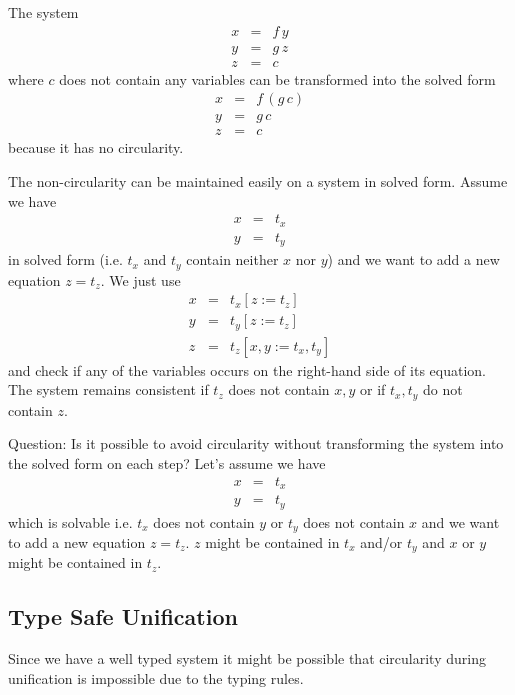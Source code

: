 The system
$$
\begin{array}{lll}
  x &=& f\, y
  \\
  y &=& g\, z
  \\
  z &=& c
\end{array}
$$
%
where $c$ does not contain any variables can be transformed into the solved
form
$$
\begin{array}{lll}
  x &=& f\, (g \, c)
  \\
  y &=& g\, c
  \\
  z &=& c
\end{array}
$$
%
because it has no circularity.

The non-circularity can be maintained easily on a system in solved
form. Assume we have
$$
%
\begin{array}{lll}
  x &=& t_x
  \\
  y &=& t_y
\end{array}
$$
%
in solved form (i.e. $t_x$ and $t_y$ contain neither $x$ nor $y$) and we want
to add a new equation $z = t_z$. We just use
$$
%
\begin{array}{lll}
  x &=& t_x[z := t_z]
  \\
  y &=& t_y[z := t_z]
  \\
  z &=& t_z[x,y := t_x, t_y]
\end{array}
$$
%
and check if any of the variables occurs on the right-hand side of its
equation. The system remains consistent if $t_z$ does not contain $x,y$ or if
$t_x,t_y$ do not contain $z$.


Question: Is it possible to avoid circularity without transforming the system
into the solved form on each step? Let's assume we have
$$
%
\begin{array}{lll}
  x &=& t_x
  \\
  y &=& t_y
\end{array}
$$
%
which is solvable i.e. $t_x$ does not contain $y$ or $t_y$ does not contain
$x$ and we want to add a new equation $z = t_z$. $z$ might be contained in
$t_x$ and/or $t_y$ and $x$ or $y$ might be contained in $t_z$.




\subsection{Type Safe Unification}

Since we have a well typed system it might be possible that circularity during
unification is impossible due to the typing rules.

